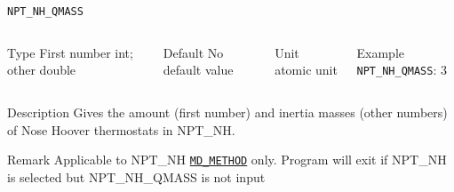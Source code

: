 \begin{frame}[allowframebreaks]{\texttt{NPT\_NH\_QMASS}} \label{NPT_NH_QMASS}
\vspace*{-12pt}
\begin{columns}
\begin{block}{Type}
First number int; other double
\end{block}

\begin{block}{Default}
No default value
\end{block}

\begin{block}{Unit}
atomic unit
\end{block}

\begin{block}{Example}
\texttt{NPT\_NH\_QMASS}: 3
\end{block}
\end{columns}

\begin{block}{Description}
Gives the amount (first number) and inertia masses (other numbers) of Nose Hoover thermostats in NPT\_NH.
\end{block}

\begin{block}{Remark}
Applicable to NPT\_NH \hyperlink{MD_METHOD}{\texttt{MD\_METHOD}} only.
Program will exit if NPT\_NH is selected but NPT\_NH\_QMASS is not input
\end{block}

\end{frame}



